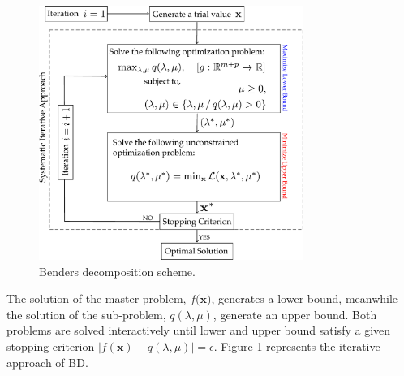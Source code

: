 \begin{figure}[H]
\centering
\includegraphics[width=0.77\textwidth]{Figures/BDScheme.pdf} 
\caption{Benders decomposition scheme.}
\label{fig:BDScheme}
\end{figure}
The solution of the master problem, $f(\textbf{x)}$, generates a lower bound, meanwhile the solution of the sub-problem, $q(\lambda, \mu)$, generate an upper bound. Both problems are solved interactively until lower and upper bound satisfy a given stopping criterion $|f(\textbf{x}) - q(\lambda, \mu)| = \epsilon$. Figure \ref{fig:BDScheme} represents the iterative approach of BD.
